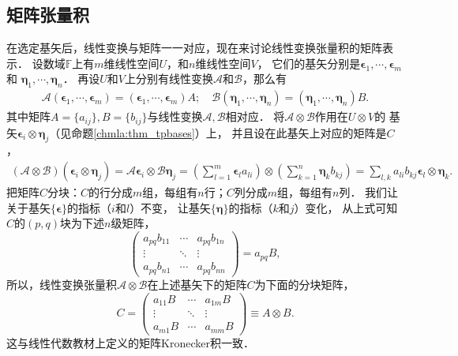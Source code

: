 \subsection{矩阵张量积}
在选定基矢后，线性变换与矩阵一一对应，现在来讨论线性变换张量积的矩阵表示．
设数域$\mathbb{F}$上有$m$维线性空间$U$，和$n$维线性空间$V$，
它们的基矢分别是$\boldsymbol{\epsilon}_1, \cdots, \boldsymbol{\epsilon}_m$和
$\boldsymbol{\eta}_1, \cdots, \boldsymbol{\eta}_n$．
再设$U$和$V$上分别有线性变换$\mathcal{A}$和$\mathcal{B}$，那么有
\begin{align}
    \mathcal{A}(\boldsymbol{\epsilon}_1, \cdots, \boldsymbol{\epsilon}_m)
      = (\boldsymbol{\epsilon}_1, \cdots, \boldsymbol{\epsilon}_m) {A};  \quad
    \mathcal{B}(\boldsymbol{\eta}_1, \cdots, \boldsymbol{\eta}_n)
      = (\boldsymbol{\eta}_1, \cdots, \boldsymbol{\eta}_n) {B}.
\end{align}
其中矩阵${A}=\{a_{ij}\},{B}=\{b_{ij}\}$与线性变换$\mathcal{A},\mathcal{B}$相对应．
将$\mathcal{A}\otimes \mathcal{B}$作用在$U\otimes V$的
基矢$\boldsymbol{\epsilon}_i\otimes \boldsymbol{\eta}_j$（见命题\ref{chmla:thm_tpbases}）上，
并且设在此基矢上对应的矩阵是${C}$，
\begin{align*}
    (\mathcal{A}\otimes \mathcal{B}) (\boldsymbol{\epsilon}_i\otimes \boldsymbol{\eta}_j)
    =\mathcal{A} \boldsymbol{\epsilon}_i \otimes \mathcal{B}\boldsymbol{\eta}_j
    =\left(\sum_{l=1}^{m}\boldsymbol{\epsilon}_l a_{li}\right) \otimes
     \left(\sum_{k=1}^{n}\boldsymbol{\eta}_k b_{kj}\right)
    = \sum_{l,k}a_{li}b_{kj} \boldsymbol{\epsilon}_l \otimes\boldsymbol{\eta}_k .
\end{align*}
把矩阵${C}$分块：${C}$的行分成$m$组，每组有$n$行；${C}$列分成$m$组，每组有$n$列．
我们让关于基矢$\{\boldsymbol{\epsilon}\}$的指标（$i$和$l$）不变，
让基矢$\{\boldsymbol{\eta}\}$的指标（$k$和$j$）变化，
从上式可知${C}$的$(p,q)$块为下述$n$级矩阵，
\begin{equation}
    \begin{pmatrix}
       a_{pq} b_{11}  &\cdots &a_{pq} b_{1n} \\
         \vdots &  \ddots & \vdots \\
       a_{pq} b_{n1}  &\cdots &a_{pq} b_{nn}
    \end{pmatrix}
     = a_{pq}{B},
\end{equation}
所以，线性变换张量积$\mathcal{A}\otimes \mathcal{B}$在上述基矢下的矩阵${C}$为下面的分块矩阵，
\begin{equation}\label{chmla:eqn_KroneckerProduct}
    {C} =
    \begin{pmatrix}
        a_{11}{B} &\cdots &a_{1m}{B} \\
        \vdots &  \ddots & \vdots \\
        a_{m1}{B}  &\cdots &a_{mm}{B}
    \end{pmatrix}
    \equiv {A}\otimes {B} .
\end{equation}
这与线性代数教材上定义的矩阵Kronecker积一致．

